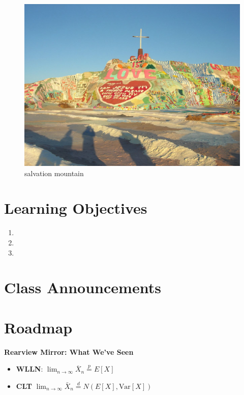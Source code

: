 \documentclass[
]{book}
\providecommand{\tightlist}{%
  \setlength{\itemsep}{0pt}\setlength{\parskip}{0pt}}
\theoremstyle{definition}
\theoremstyle{definition}
\theoremstyle{definition}
\theoremstyle{definition}
\theoremstyle{remark}
\begin{document}
\begin{figure}
\centering
\includegraphics{./images/salvation_mountain.jpg}
\caption{salvation mountain}
\end{figure}

\hypertarget{learning-objectives-13}{%
\section{Learning Objectives}\label{learning-objectives-13}}

\begin{enumerate}
\def\labelenumi{\arabic{enumi}.}
\tightlist
\item
\item
\item
\end{enumerate}

\hypertarget{class-announcements-12}{%
\section{Class Announcements}\label{class-announcements-12}}

\hypertarget{roadmap-10}{%
\section{Roadmap}\label{roadmap-10}}

\textbf{Rearview Mirror: What We've Seen}

\begin{itemize}
\tightlist
\item
  \textbf{WLLN}: \(\displaystyle\lim_{n \to \infty} \overline{X}_n \overset{p}{=} E[X]\)
\item
  \textbf{CLT} \(\displaystyle\lim_{n \to \infty} \bar{X}_n \overset{d}{=} N(E[X], \text{Var}[X])\)
\end{itemize}
\end{document}
